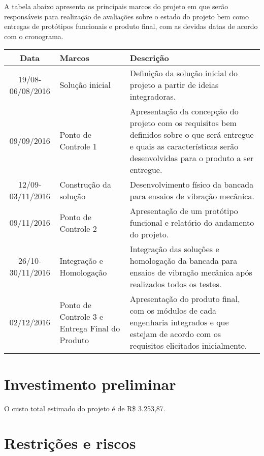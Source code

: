 	A tabela abaixo apresenta os principais marcos do projeto em que serão responsáveis para realização
    de avaliações sobre o estado do projeto bem como entregas de protótipos funcionais e produto final,
    com as devidas datas de acordo com o cronograma.

  \begin{table}[h]
  \centering
  \begin{tabular}{|c|p{4.5cm}|p{8cm}|}
	\hline
  Data & Marcos & Descrição\\
  \hline                               
  19/08-06/08/2016 & Solução inicial & Definição da solução inicial do projeto a partir de ideias integradoras.\\
  \hline                               
  09/09/2016 & Ponto de Controle 1 & Apresentação da concepção do projeto com os requisitos bem definidos 
  									sobre o que será entregue e quais as características serão 												desenvolvidas para o produto a ser entregue.\\
  \hline                               
  12/09-03/11/2016 & Construção da solução & Desenvolvimento físico da bancada para ensaios de vibração mecânica.\\
  \hline                               
  09/11/2016 & Ponto de Controle 2 & Apresentação de um protótipo funcional e relatório do 
  									andamento do projeto.\\
  \hline                               
  26/10-30/11/2016 & Integração e Homologação & Integração das soluções e homologação da bancada para ensaios de vibração mecânica após realizados todos os testes.\\
  \hline
  02/12/2016 & Ponto de Controle 3 e Entrega Final do Produto & Apresentação do produto final, com os módulos 																	de cada engenharia integrados e que 																	estejam de acordo com os requisitos 																	elicitados inicialmente.\\
  \hline
  \end{tabular}
  \end{table}


\section*{Investimento preliminar}

	O custo total estimado do projeto é de R\$ 3.253,87.

\section*{Restrições e riscos}
	
